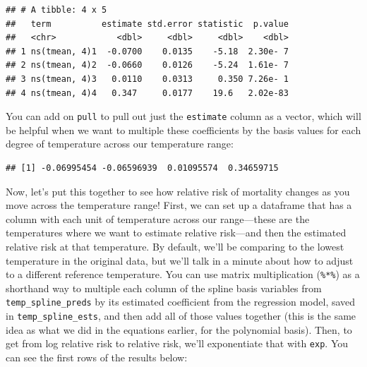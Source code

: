 \documentclass[
]{book}
\newenvironment{Shaded}{\begin{snugshade}}{\end{snugshade}}
\newcommand{\KeywordTok}[1]{\textcolor[rgb]{0.13,0.29,0.53}{\textbf{#1}}}
\newcommand{\NormalTok}[1]{#1}
\newcommand{\OperatorTok}[1]{\textcolor[rgb]{0.81,0.36,0.00}{\textbf{#1}}}
\newcommand{\StringTok}[1]{\textcolor[rgb]{0.31,0.60,0.02}{#1}}
\begin{document}
\begin{Shaded}
\end{Shaded}

\begin{verbatim}
## # A tibble: 4 x 5
##   term          estimate std.error statistic  p.value
##   <chr>            <dbl>     <dbl>     <dbl>    <dbl>
## 1 ns(tmean, 4)1  -0.0700    0.0135    -5.18  2.30e- 7
## 2 ns(tmean, 4)2  -0.0660    0.0126    -5.24  1.61e- 7
## 3 ns(tmean, 4)3   0.0110    0.0313     0.350 7.26e- 1
## 4 ns(tmean, 4)4   0.347     0.0177    19.6   2.02e-83
\end{verbatim}

You can add on \texttt{pull} to pull out just the \texttt{estimate} column as a vector, which will be
helpful when we want to multiple these coefficients by the basis values for each degree
of temperature across our temperature range:

\begin{Shaded}
\end{Shaded}

\begin{verbatim}
## [1] -0.06995454 -0.06596939  0.01095574  0.34659715
\end{verbatim}

Now, let's put this together to see how relative risk of mortality changes as you move
across the temperature range! First, we can set up a dataframe that has a column with
each unit of temperature across our range---these are the temperatures where we want to
estimate relative risk---and then the estimated relative risk at that temperature. By
default, we'll be comparing to the lowest temperature in the original data, but we'll talk
in a minute about how to adjust to a different reference temperature. You can use
matrix multiplication (\texttt{\%*\%}) as a shorthand way to multiple each column of the spline
basis variables from \texttt{temp\_spline\_preds} by its estimated coefficient from the regression
model, saved in \texttt{temp\_spline\_ests}, and then add all of those values together (this is
the same idea as what we did in the equations earlier, for the polynomial basis). Then,
to get from log relative risk to relative risk, we'll exponentiate that with \texttt{exp}. You
can see the first rows of the results below:
\end{document}
